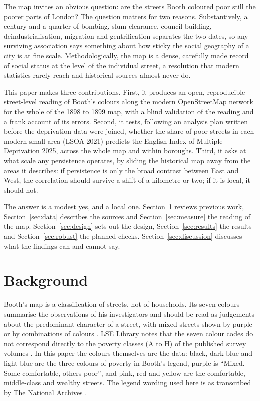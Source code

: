 The map invites an obvious question: are the streets Booth coloured poor still the poorer parts of London? The question matters for two reasons. Substantively, a century and a quarter of bombing, slum clearance, council building, deindustrialisation, migration and gentrification separates the two dates, so any surviving association says something about how sticky the social geography of a city is at fine scale. Methodologically, the map is a dense, carefully made record of social status at the level of the individual street, a resolution that modern statistics rarely reach and historical sources almost never do.

This paper makes three contributions. First, it produces an open, reproducible street-level reading of Booth's colours along the modern OpenStreetMap network for the whole of the 1898 to 1899 map, with a blind validation of the reading and a frank account of its errors. Second, it tests, following an analysis plan written before the deprivation data were joined, whether the share of poor streets in each modern small area (LSOA 2021) predicts the English Index of Multiple Deprivation 2025, across the whole map and within boroughs. Third, it asks at what scale any persistence operates, by sliding the historical map away from the areas it describes: if persistence is only the broad contrast between East and West, the correlation should survive a shift of a kilometre or two; if it is local, it should not.

The answer is a modest yes, and a local one. Section~\ref{sec:background} reviews previous work, Section~\ref{sec:data} describes the sources and Section~\ref{sec:measure} the reading of the map. Section~\ref{sec:design} sets out the design, Section~\ref{sec:results} the results and Section~\ref{sec:robust} the planned checks. Section~\ref{sec:discussion} discusses what the findings can and cannot say.

\section{Background}\label{sec:background}

Booth's map is a classification of streets, not of households. Its seven colours summarise the observations of his investigators and should be read as judgements about the predominant character of a street, with mixed streets shown by purple or by combinations of colours \citep{lse_maps}. LSE Library notes that the seven colour codes do not correspond directly to the poverty classes (A to H) of the published survey volumes \citep{lse_maps}. In this paper the colours themselves are the data: black, dark blue and light blue are the three colours of poverty in Booth's legend, purple is ``Mixed. Some comfortable, others poor'', and pink, red and yellow are the comfortable, middle-class and wealthy streets. The legend wording used here is as transcribed by The National Archives \citep{tna}.

